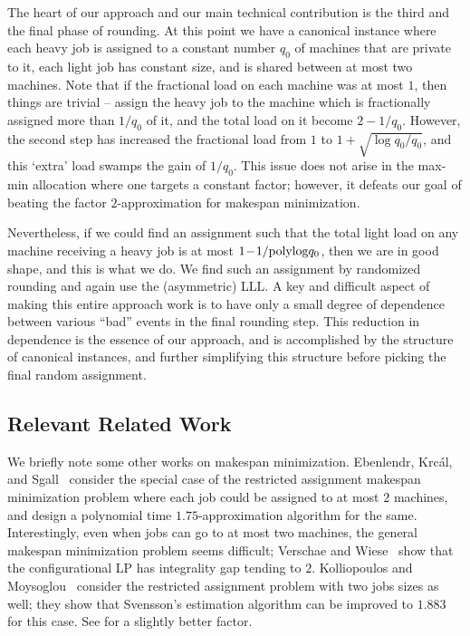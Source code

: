 \documentclass[11pt]{article}
\newcommand{\polylog}{\mathrm{polylog}}
\begin{document}
The heart of our approach and our main technical contribution is the third and the final phase of rounding. At this point we have a canonical instance where each heavy job is assigned to a constant number $q_0$ of machines that are private to it, each light job has constant size, and is shared between at most  two machines. Note that if the fractional load on each machine was at most $1$, then things are trivial -- assign the heavy job to the machine which is fractionally assigned more than $1/q_0$ of it, and the total load on it become $2-1/q_0$. 
However, the second step has increased the fractional load from $1$ to $1\!\!+\!\!\sqrt{\log q_0/q_0}$, and this `extra' load swamps the gain of $1/q_0$.
This issue does not arise in the max-min allocation where one targets a constant factor; however, it defeats our goal of beating the 
factor $2$-approximation for makespan minimization.

Nevertheless, if we could find an assignment such that the total light load on any machine receiving a heavy job is at most $1\!-\!1/{\small \polylog q_0}$, then we are in good shape, and this is what we do.
We find such an assignment by randomized rounding and again use the (asymmetric) LLL. A key and difficult aspect of making this entire approach work is to have only a small degree of dependence between various ``bad'' events in the final rounding step. This reduction in dependence is the essence of our approach, and is accomplished by the structure of canonical instances, and further simplifying this structure before picking the final random assignment.

\subsection{Relevant Related Work}
We briefly note some other works on makespan minimization. Ebenlendr, Krc\'{a}l, and Sgall~\cite{EKS08} consider the special case of the restricted assignment makespan minimization problem where each job could be assigned to at most $2$ machines, and design a polynomial time $1.75$-approximation algorithm for the same. Interestingly, even when jobs can go to at most two machines, the general makespan minimization problem seems difficult; Verschae and Wiese~\cite{VW11} show that the configurational LP has integrality gap tending to $2$. Kolliopoulos and Moysoglou~\cite{KM13} consider the restricted assignment problem with two jobs sizes as well; they show that Svensson's estimation algorithm can be improved to $1.883$ for this case. See  for a slightly better factor.
\end{document}
